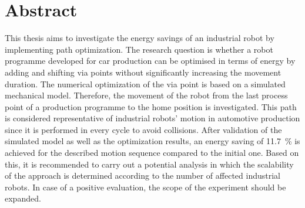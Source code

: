 \chapter*{Abstract} %
This thesis aims to investigate the energy savings of an industrial robot by implementing path optimization. The research question is whether a robot programme developed for car production can be optimised in terms of energy by adding and shifting via points without significantly increasing the movement duration. The numerical optimization of the via point is based on a simulated mechanical model. Therefore, the movement of the robot from the last process point of a production programme to the home position is investigated. This path is considered representative of industrial robots' motion in automotive production since it is performed in every cycle to avoid collisions. After validation of the simulated model as well as the optimization results, an energy saving of 11.7~\% is achieved for the described motion sequence compared to the initial one. Based on this, it is recommended to carry out a potential analysis in which the scalability of the approach is determined according to the number of affected industrial robots. In case of a positive evaluation, the scope of the experiment should be expanded.
\cleardoublepage
